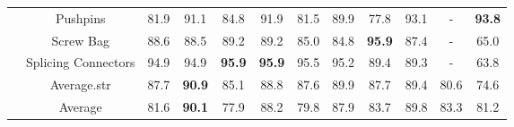 \documentclass[final,5p,times,twocolumn]{elsarticle}
\begin{document}
\begin{table*}[]
{\begin{tabular}{c|ccc|cc|cc|cc|c|c}
 & \multicolumn{1}{c|}{Pushpins} & 81.9 & 91.1 & 84.8 & 91.9 & 81.5 & 89.9 & 77.8 & 93.1 & - & \textbf{93.8} \\
 & \multicolumn{1}{c|}{Screw Bag} & 88.6 & 88.5 & 89.2 & 89.2 & 85.0 & 84.8 & \textbf{95.9} & 87.4 & - & 65.0 \\
 & \multicolumn{1}{c|}{Splicing Connectors} & 94.9 & 94.9 & \textbf{95.9} & \textbf{95.9 }& 95.5 & 95.2 & 89.4 & 89.3 & - & 63.8 \\ \cline{2-12} 
 & \multicolumn{1}{c|}{Average.str} & 87.7 & \textbf{90.9} & 85.1 & 88.8 & 87.6 & 89.9 & 87.7 & 89.4 & 80.6 & 74.6 \\ \cline{2-12} 
 & \multicolumn{1}{c|}{Average} & 81.6 & \textbf{90.1} & 77.9 & 88.2 & 79.8 & 87.9 & 83.7 & 89.8 & 83.3 & 81.2 \\ \hline
\end{tabular}}
\end{table*}

\begin{table*}[]
\caption{Quantitative comparisons of image-level detection results on the CAD-SD dataset. (AUROC\%)}
\centering
\label{Table2}
\end{table*}
\end{document}
